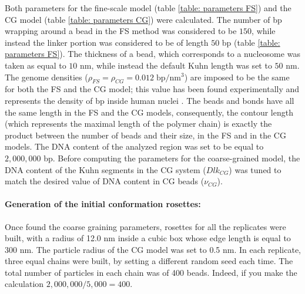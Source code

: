 Both parameters for the fine-scale model (table \ref{table: parameters FS}) and the CG model (table \ref{table: parameters CG}) were calculated. The number of bp wrapping around a bead in the FS method was considered to be $150$, while instead the linker portion was considered to be of length $50$ bp (table \ref{table: parameters FS}). The thickness of a bead, which corresponds to a nucleosome was taken as equal to $10$ nm, while instead the default Kuhn length was set to $50$ nm. The genome densities ($\rho_{FS} = \rho_{CG} = 0.012\; \text{bp}/\text{nm}^3$) are imposed to be the same for both the FS and the CG model; this value has been found experimentally and represents the density of bp inside human nuclei
\cite{golkaramRoleChromatinDensity2017}.
The beads and bonds have all the same length in the FS and the CG models, consequently, the contour length (which represents the maximal length of the polymer chain) is exactly the product between the number of beads and their size, in the FS and in the CG models. The DNA content of the analyzed region was set to be equal to $2,000,000$ bp. Before computing the parameters for the coarse-grained model, the DNA content of the Kuhn segments in the CG system ($Dlk_{CG}$) was tuned to match the desired value of DNA content in CG beads ($\nu_{CG}$).


\paragraph{Generation of the initial conformation rosettes:}

Once found the coarse graining parameters, rosettes for all the replicates were built, with a radius of 12.0 nm inside a cubic box whose edge length is equal to 300 nm. The particle radius of the CG model was set to 0.5 nm. In each replicate, three equal chains were built, by setting a different random seed each time. The total number of particles in each chain was of 400 beads. Indeed, if you make the calculation $2,000,000/5,000 = 400$.



